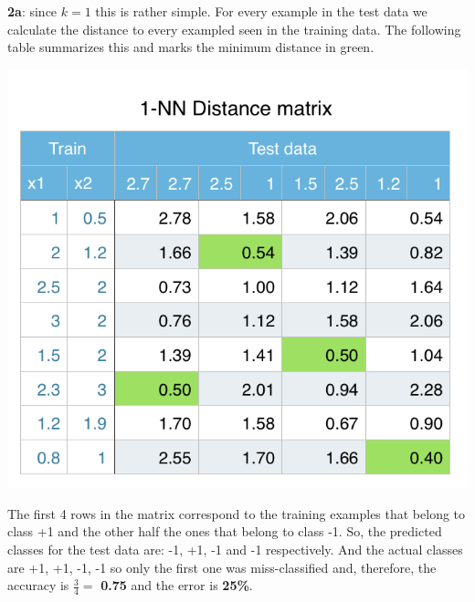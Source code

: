 \documentclass[11pt]{article}
\begin{document}
\textbf{2a}: since $k = 1$ this is rather simple. For every example in the test data we calculate the distance to every exampled seen in the training data. The following table summarizes this and marks the minimum distance in green.
\begin{center}
\includegraphics[scale=0.75]{distances.png}
\end{center}

The first 4 rows in the matrix correspond to the training examples that belong to class +1 and the other half the ones that belong to class -1. So, the predicted classes for the test data are: -1, +1, -1 and -1 respectively. And the actual classes are +1, +1, -1, -1 so only the first one was miss-classified and, therefore, the accuracy is $\frac{3}{4} = $ \textbf{0.75} and the error is \textbf{25\%}.\\
\end{document}
